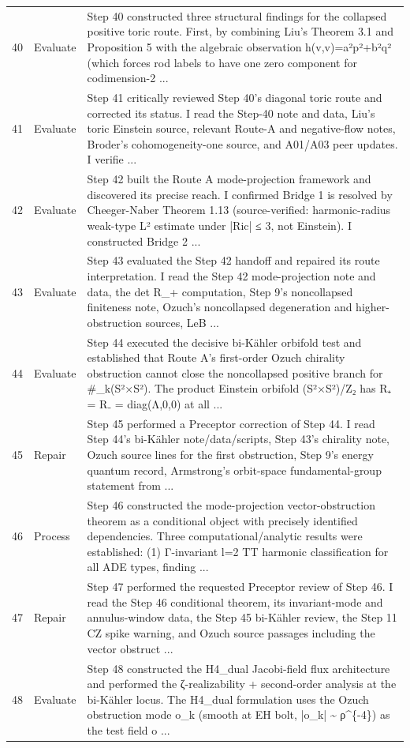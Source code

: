 \documentclass[UTF8,fontset=fandol,zihao=-4]{ctexart}
\begin{document}
\begin{longtable}{r p{} >{\raggedright\arraybackslash}p{}}
40 & Evaluate & Step 40 constructed three structural findings for the collapsed positive toric route. First, by combining Liu's Theorem 3.1 and Proposition 5 with the algebraic observation h(v,v)=a²p²+b²q² (which forces rod labels to have one zero component for codimension-2  ...\\
41 & Evaluate & Step 41 critically reviewed Step 40's diagonal toric route and corrected its status. I read the Step-40 note and data, Liu's toric Einstein source, relevant Route-A and negative-flow notes, Broder's cohomogeneity-one source, and A01/A03 peer updates. I verifie ...\\
42 & Evaluate & Step 42 built the Route A mode-projection framework and discovered its precise reach. I confirmed Bridge 1 is resolved by Cheeger-Naber Theorem 1.13 (source-verified: harmonic-radius weak-type L² estimate under |Ric| ≤ 3, not Einstein). I constructed Bridge 2  ...\\
43 & Evaluate & Step 43 evaluated the Step 42 handoff and repaired its route interpretation. I read the Step 42 mode-projection note and data, the det R\_+ computation, Step 9's noncollapsed finiteness note, Ozuch's noncollapsed degeneration and higher-obstruction sources, LeB ...\\
44 & Evaluate & Step 44 executed the decisive bi-Kähler orbifold test and established that Route A's first-order Ozuch chirality obstruction cannot close the noncollapsed positive branch for \#\_k(S²×S²). The product Einstein orbifold (S²×S²)/Z₂ has R₊ = R₋ = diag(Λ,0,0) at all ...\\
45 & Repair & Step 45 performed a Preceptor correction of Step 44. I read Step 44’s bi-Kähler note/data/scripts, Step 43’s chirality note, Ozuch source lines for the first obstruction, Step 9’s energy quantum record, Armstrong’s orbit-space fundamental-group statement from  ...\\
46 & Process & Step 46 constructed the mode-projection vector-obstruction theorem as a conditional object with precisely identified dependencies. Three computational/analytic results were established: (1) Γ-invariant l=2 TT harmonic classification for all ADE types, finding  ...\\
47 & Repair & Step 47 performed the requested Preceptor review of Step 46. I read the Step 46 conditional theorem, its invariant-mode and annulus-window data, the Step 45 bi-Kähler review, the Step 11 CZ spike warning, and Ozuch source passages including the vector obstruct ...\\
48 & Evaluate & Step 48 constructed the H4\_dual Jacobi-field flux architecture and performed the ζ-realizability + second-order analysis at the bi-Kähler locus. The H4\_dual formulation uses the Ozuch obstruction mode o\_k (smooth at EH bolt, |o\_k| \textasciitilde{} ρ\textasciicircum{}\{-4\}) as the test field o ...\\

\end{longtable}
\end{document}
